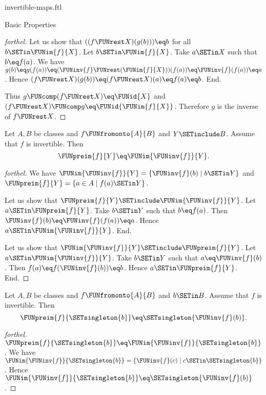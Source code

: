 \documentclass{naproche-library}
\begin{document}
\begin{smodule}[title=Invertible Maps]{invertible-maps.ftl}
\begin{sfragment}{Basic Properties}
\begin{proof}[forthel]
    Let us show that $((f \FUNrest X)(g(b))) \eq b$ for all $b \SETin \FUNim{f}{X}$.
      Let $b \SETin \FUNim{f}{X}$.
      Take $a \SETin X$ such that $b \eq f(a)$.
      We have $g(b)
        \eq g(f(a))
        \eq (\FUNinv{f} \FUNrest (\FUNim{f}{X}))(f(a))
        \eq \FUNinv{f}(f(a))
        \eq a$.
      Hence $(f \FUNrest X)(g(b))
        \eq (f \FUNrest X)(a)
        \eq f(a)
        \eq b$.
    End.

    Thus $g \FUNcomp (f \FUNrest X) \eq \FUNid{X}$ and $(f \FUNrest X) \FUNcomp g \eq \FUNid{\FUNim{f}{X}}$.
    Therefore $g$ is the inverse of $f \FUNrest X$.
  \end{proof}

  \begin{proposition}[forthel,id=FOUNDATIONS_09_7726021377785856]
    Let $A, B$ be classes and $f \FUNfromonto{A}{B}$ and $Y \SETinclude B$.
    Assume that $f$ is invertible.
    Then \[ \FUNpreim{f}{Y} \eq \FUNim{\FUNinv{f}}{Y}. \]
  \end{proposition}
  \begin{proof}[forthel]
    We have $\FUNim{\FUNinv{f}}{Y} = \{ \FUNinv{f}(b) \mid b \SETin Y \}$ and $\FUNpreim{f}{Y} = \{ a \in A \mid f(a) \SETin Y \}$.

    Let us show that $\FUNpreim{f}{Y} \SETinclude \FUNim{\FUNinv{f}}{Y}$.
      Let $a \SETin \FUNpreim{f}{Y}$.
      Take $b \SETin Y$ such that $b \eq f(a)$.
      Then $\FUNinv{f}(b) \eq \FUNinv{f}(f(a)) \eq a$.
      Hence $a \SETin \FUNim{\FUNinv{f}}{Y}$.
    End.

    Let us show that $\FUNim{\FUNinv{f}}{Y} \SETinclude \FUNpreim{f}{Y}$.
      Let $a \SETin \FUNim{\FUNinv{f}}{Y}$.
      Take $b \SETin Y$ such that $a \eq \FUNinv{f}(b)$.
      Then $f(a) \eq f(\FUNinv{f}(b)) \eq b$.
      Hence $a \SETin \FUNpreim{f}{Y}$.
    End.
  \end{proof}

  \begin{corollary}[forthel,id=FOUNDATIONS_09_8607784268464128]
    Let $A, B$ be classes and $f \FUNfromonto{A}{B}$ and $b \SETin B$.
    Assume that $f$ is invertible.
    Then \[ \FUNpreim{f}{\SETsingleton{b}} \eq \SETsingleton{\FUNinv{f}(b)}. \]
  \end{corollary}
  \begin{proof}[forthel]
    $\FUNpreim{f}{\SETsingleton{b}} \eq \FUNim{\FUNinv{f}}{\SETsingleton{b}}$.
    We have $\FUNim{\FUNinv{f}}{\SETsingleton{b}} = \{ \FUNinv{f}(c) \mid c \SETin \SETsingleton{b} \}$.
    Hence $\FUNim{\FUNinv{f}}{\SETsingleton{b}} \eq \SETsingleton{\FUNinv{f}(b)}$.
  \end{proof}


\end{sfragment}
\end{smodule}
\end{document}
